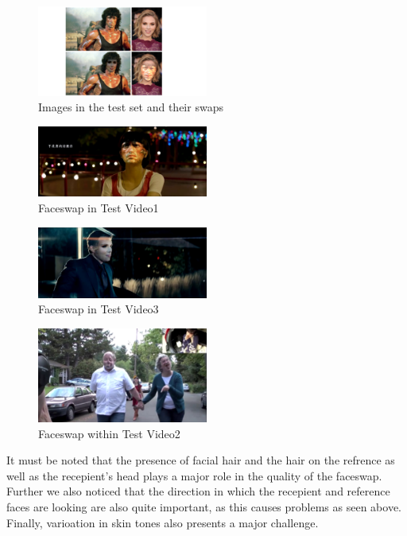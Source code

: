 \documentclass[conference]{IEEEtran}
\begin{document}
\begin{figure}[H]
\includegraphics[width=0.5\textwidth]{Rambo_Johansson.png}
\centering
\caption{Images in the test set and their swaps}
\end{figure}

\begin{figure}[H]
\includegraphics[width=0.5\textwidth]{korambo.png}
\centering
\caption{Faceswap in Test Video1}
\end{figure}


\begin{figure}[H]
\includegraphics[width=0.5\textwidth]{scarbat.png}
\centering
\caption{Faceswap in Test Video3}
\end{figure}

\begin{figure}[H]
\includegraphics[width=0.5\textwidth]{couple.png}
\centering
\caption{Faceswap within Test Video2}
\end{figure}

It must be noted that the presence of facial hair and the hair on the refrence as well as the recepient's head plays a major role in the quality of the faceswap. Further we also noticed that the direction in which the recepient and reference faces are looking are also quite important, as this causes problems as seen above. Finally, varioation in skin tones also presents a major challenge.
\end{document}
